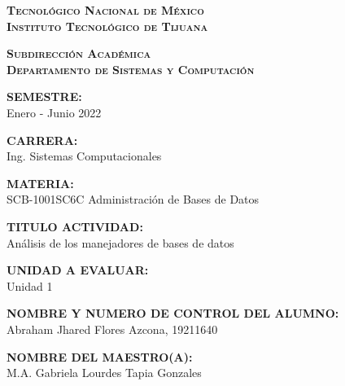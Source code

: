 \documentclass[stu, 12pt, letterpaper, donotrepeattitle, floatsintext, natbib]{apa7}
\begin{document}
    \begin{titlepage}
        \thispagestyle{portada}
        \centering
        \vspace*{0.2cm}
        {\large\scshape\bfseries Tecnológico Nacional de México\\Instituto Tecnológico de Tijuana\par}
        \vspace{0.6cm}
        {\normalsize\scshape\bfseries Subdirección Académica\\Departamento de Sistemas y Computación\par}
        \vspace{0.6cm}
        {{\bfseries SEMESTRE:}\\Enero - Junio 2022\par}
        \vspace{\baselineskip}
        {{\bfseries CARRERA:}\\Ing. Sistemas Computacionales\par}
        \vspace{\baselineskip}
        {{\bfseries MATERIA:}\\SCB-1001SC6C Administración de Bases de Datos\par}
        \vspace{\baselineskip}
        {{\bfseries TITULO ACTIVIDAD:}\\Análisis de los manejadores de bases de datos\par}
        \vspace{\baselineskip}
        {{\bfseries UNIDAD A EVALUAR:}\\Unidad 1 \par}
        \vspace{\baselineskip}
        {{\bfseries NOMBRE Y NUMERO DE CONTROL DEL ALUMNO:}\\Abraham Jhared Flores Azcona, 19211640\par}
        \vspace{\baselineskip}
        {{\bfseries NOMBRE DEL MAESTRO(A):}\\M.A. Gabriela Lourdes Tapia Gonzales\par}
        \vspace{\baselineskip}
    \end{titlepage}

\renewcommand\contentsname{Contenido}
\tableofcontents
\pagebreak
\end{document}
